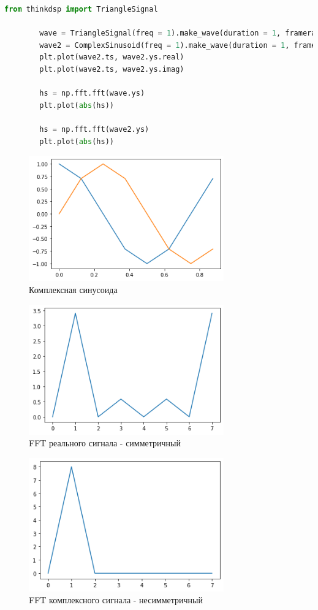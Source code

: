 \documentclass[a4paper, 12pt]{report}
\begin{document}
	\begin{lstlisting}[language=Python,caption=Сравнение реального сигнала с комплексным]
		from thinkdsp import TriangleSignal

		wave = TriangleSignal(freq = 1).make_wave(duration = 1, framerate = 8)
		wave2 = ComplexSinusoid(freq = 1).make_wave(duration = 1, framerate = 8)
		plt.plot(wave2.ts, wave2.ys.real)
		plt.plot(wave2.ts, wave2.ys.imag)

		hs = np.fft.fft(wave.ys)
		plt.plot(abs(hs))
		
		hs = np.fft.fft(wave2.ys)
		plt.plot(abs(hs))
	\end{lstlisting}
	\begin{figure}[H]
		\centering
		\includegraphics[width=0.75\textwidth]{task5.png}
		\caption{Комплексная синусоида}
		\label{fig:task5}
	\end{figure}
	\begin{figure}[H]
		\centering
		\includegraphics[width=0.75\textwidth]{task6.png}
		\caption{FFT реального сигнала - симметричный}
		\label{fig:task6}
	\end{figure}
	\begin{figure}[H]
		\centering
		\includegraphics[width=0.75\textwidth]{task7.png}
		\caption{FFT комплексного сигнала - несимметричный}
		\label{fig:task7}
	\end{figure}
	
\end{document}
